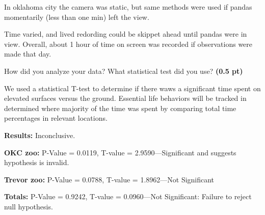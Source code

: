 \documentclass[12pt,a4paper]{article}
\begin{document}
\begin{enumerate}[font=\bfseries, wide, resume]
    In oklahoma city the camera was static, but same methods were used if pandas momentarily (less than one min) left the view. 

    Time varied, and lived redording could be skippet ahead until pandas were in view. Overall, about 1 hour of time on screen was recorded if observations were made that day.
    
    {\color{under}\item  How did you analyze your data? What statistical test did you use? \textbf{(0.5 pt)}}

    We used a statistical T-test to determine if there waws a significant time spent on elevated surfaces versus the ground. Essential life behaviors will be tracked in determined where majority of the time was spent by comparing total time percentages in relevant locations.

   \textbf{Results:} Inconclusive.

   \textbf{OKC zoo:} P-Value = 0.0119, T-value = 2.9590---Significant and suggests hypothesis is invalid.

    \textbf{Trevor zoo:} P-Value = 0.0788, T-value = 1.8962---Not Significant

    \textbf{Totals:} P-Value = 0.9242, T-value = 0.0960---Not Significant: Failure to reject null hypothesis.
\end{enumerate}
\newpage
\end{document}
